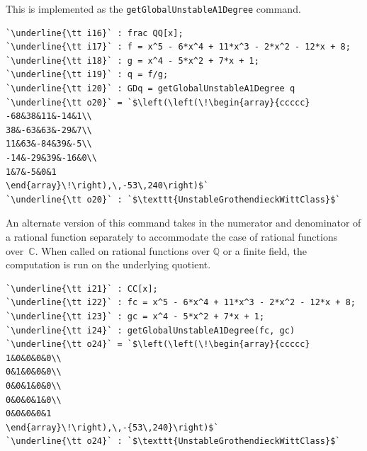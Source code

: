 \documentclass[12pt]{amsart}
\theoremstyle{definition}
\begin{document}
This is implemented as the \texttt{getGlobalUnstableA1Degree} command.
\begin{lstlisting}[language=Macaulay2output]
`\underline{\tt i16}` : frac QQ[x];
`\underline{\tt i17}` : f = x^5 - 6*x^4 + 11*x^3 - 2*x^2 - 12*x + 8;
`\underline{\tt i18}` : g = x^4 - 5*x^2 + 7*x + 1;
`\underline{\tt i19}` : q = f/g;
`\underline{\tt i20}` : GDq = getGlobalUnstableA1Degree q
`\underline{\tt o20}` = `$\left(\left(\!\begin{array}{ccccc}
-68&38&11&-14&1\\
38&-63&63&-29&7\\
11&63&-84&39&-5\\
-14&-29&39&-16&0\\
1&7&-5&0&1
\end{array}\!\right),\,-53\,240\right)$`
`\underline{\tt o20}` : `$\texttt{UnstableGrothendieckWittClass}$`
\end{lstlisting}
An alternate version of this command takes in the numerator and denominator of a rational function separately to accommodate the case of rational functions over~$\mathbb{C}$. When called on rational functions over $\mathbb{Q}$ or a finite field, the computation is run on the underlying quotient. 
\begin{lstlisting}[language=Macaulay2output]
`\underline{\tt i21}` : CC[x];
`\underline{\tt i22}` : fc = x^5 - 6*x^4 + 11*x^3 - 2*x^2 - 12*x + 8;
`\underline{\tt i23}` : gc = x^4 - 5*x^2 + 7*x + 1;
`\underline{\tt i24}` : getGlobalUnstableA1Degree(fc, gc)
`\underline{\tt o24}` = `$\left(\left(\!\begin{array}{ccccc}
1&0&0&0&0\\
0&1&0&0&0\\
0&0&1&0&0\\
0&0&0&1&0\\
0&0&0&0&1
\end{array}\!\right),\,-{53\,240}\right)$`
`\underline{\tt o24}` : `$\texttt{UnstableGrothendieckWittClass}$`
\end{lstlisting}
\end{document}
